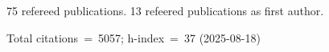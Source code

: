 75 refereed publications. 13 refeered publications as first author.

Total citations~=~5057; h-index~=~37 (2025-08-18)